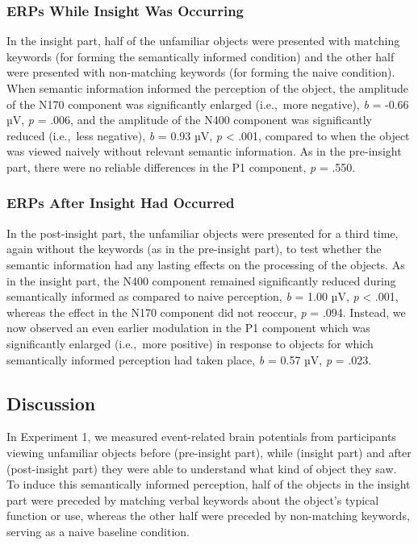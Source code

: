 \documentclass[
  english,
  man,floatsintext]{apa7}
\begin{document}
\hypertarget{erps-while-insight-was-occurring}{%
\subsubsection{ERPs While Insight Was Occurring}\label{erps-while-insight-was-occurring}}

In the insight part, half of the unfamiliar objects were presented with matching keywords (for forming the semantically informed condition) and the other half were presented with non-matching keywords (for forming the naive condition). When semantic information informed the perception of the object, the amplitude of the N170 component was significantly enlarged (i.e.,~more negative), \emph{b} = -0.66 µV, \emph{p} = .006, and the amplitude of the N400 component was significantly reduced (i.e.,~less negative), \emph{b} = 0.93 µV, \emph{p} \textless{} .001, compared to when the object was viewed naively without relevant semantic information. As in the pre-insight part, there were no reliable differences in the P1 component, \emph{p} = .550.

\hypertarget{erps-after-insight-had-occurred}{%
\subsubsection{ERPs After Insight Had Occurred}\label{erps-after-insight-had-occurred}}

In the post-insight part, the unfamiliar objects were presented for a third time, again without the keywords (as in the pre-insight part), to test whether the semantic information had any lasting effects on the processing of the objects. As in the insight part, the N400 component remained significantly reduced during semantically informed as compared to naive perception, \emph{b} = 1.00 µV, \emph{p} \textless{} .001, whereas the effect in the N170 component did not reoccur, \emph{p} = .094. Instead, we now observed an even earlier modulation in the P1 component which was significantly enlarged (i.e.,~more positive) in response to objects for which semantically informed perception had taken place, \emph{b} = 0.57 µV, \emph{p} = .023.

\hypertarget{discussion}{%
\subsection{Discussion}\label{discussion}}

In Experiment 1, we measured event-related brain potentials from participants viewing unfamiliar objects before (pre-insight part), while (insight part) and after (post-insight part) they were able to understand what kind of object they saw. To induce this semantically informed perception, half of the objects in the insight part were preceded by matching verbal keywords about the object's typical function or use, whereas the other half were preceded by non-matching keywords, serving as a naive baseline condition.
\end{document}
